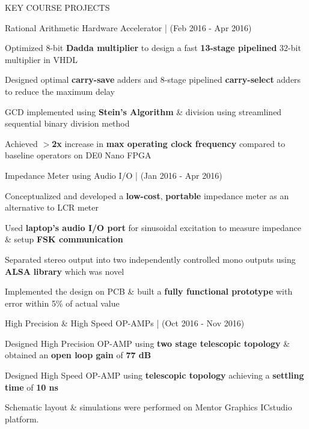 \documentclass{resume} %
\begin{document}
\begin{rSection}{KEY COURSE PROJECTS}

\begin{rSubsection}{Rational Arithmetic Hardware Accelerator | }{(Feb 2016 - Apr 2016)}{}{} 
\item Optimized 8-bit \textbf{Dadda multiplier} to design a fast \textbf{13-stage pipelined} 32-bit multiplier in VHDL
\item Designed optimal \textbf{carry-save} adders and 8-stage pipelined \textbf{carry-select} adders to reduce the maximum delay
\item GCD implemented using \textbf{Stein's Algorithm} \& division using streamlined sequential binary division method
\item Achieved $>$\textbf{2x} increase in \textbf{max operating clock frequency} compared to baseline operators on DE0 Nano FPGA
\end{rSubsection}



\vspace{-0.2em}
\begin{rSubsection}{Impedance Meter using Audio I/O | }{(Jan 2016 - Apr 2016)}{}{}
\item Conceptualized and developed a \textbf{low-cost}, \textbf{portable} impedance meter as an alternative to LCR meter
\item Used \textbf{laptop's audio I/O port} for sinusoidal excitation to measure impedance \& setup \textbf{FSK communication}
\item Separated stereo output into two independently controlled mono outputs using \textbf{ALSA} \textbf{library} which was novel
\item Implemented the design on PCB \& built a \textbf{fully functional prototype} with error within 5\% of actual value 
\end{rSubsection}

\vspace{-0.2em}
\begin{rSubsection}{High Precision \& High Speed OP-AMPs | }{(Oct 2016 - Nov 2016)}{}{}
\item Designed High Precision OP-AMP using \textbf{two stage telescopic topology} \& obtained an \textbf{open loop gain} of \textbf{77 dB}
\item Designed High Speed OP-AMP using \textbf{telescopic topology} achieving a \textbf{settling time} of \textbf{10 ns} 
\item Schematic layout \& simulations were performed on Mentor Graphics ICstudio platform.
\end{rSubsection}


\end{rSection}
\end{document}
